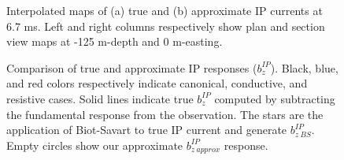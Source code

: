 \documentclass[extra,mreferee]{gji}
\begin{document}
\begin{figure}
  \caption{Interpolated maps of (a) true and (b) approximate IP currents at 6.7 ms. Left and right columns respectively show plan and section view maps at -125 m-depth and 0 m-easting. }
  \label{F:IPcurrent_PlanandSec_late}
\end{figure}

\begin{figure}
  \caption{Comparison of true and approximate IP responses ($b_z^{IP}$). Black, blue, and red colors respectively indicate canonical, conductive, and resistive cases. Solid lines indicate true $b_z^{IP}$ computed by subtracting the fundamental response from the observation. The stars are the application of Biot-Savart to true IP current and generate $b_{z \ BS}^{IP}$. Empty circles show our approximate $b_{z \  approx}^{IP}$ response. }
  \label{F:True_vs_approx_IPresp}
\end{figure}
\clearpage
\end{document}
